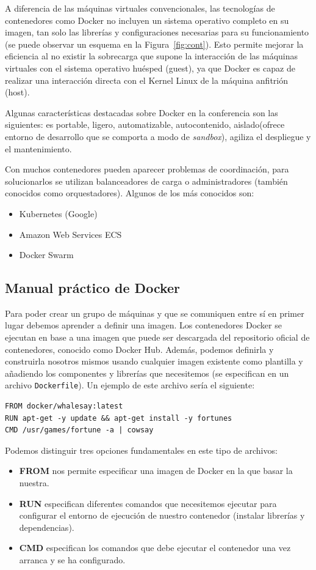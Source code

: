 A diferencia de las máquinas virtuales convencionales, las tecnologías de contenedores como Docker no incluyen un sistema operativo completo en su imagen, tan solo las librerías y configuraciones necesarias para su funcionamiento (se puede observar un esquema en la Figura~\ref{fig:cont}). Esto permite mejorar la eficiencia al no existir la sobrecarga que supone la interacción de las máquinas virtuales con el sistema operativo huésped (guest), ya que Docker es capaz de realizar una interacción directa con el Kernel Linux de la máquina anfitrión (host).

Algunas características destacadas sobre Docker en la conferencia son las siguientes: es portable, ligero, automatizable, autocontenido, aislado(ofrece entorno de desarrollo que se comporta a modo de \textit{sandbox}), agiliza el despliegue y el mantenimiento.

Con muchos contenedores pueden aparecer problemas de coordinación, para solucionarlos se utilizan balanceadores de carga o administradores (también conocidos como orquestadores). Algunos de los más conocidos son:
\begin{itemize}
\item Kubernetes (Google)
\item Amazon Web Services ECS
\item Docker Swarm
\end{itemize}

\subsection{Manual práctico de Docker}
Para poder crear un grupo de máquinas y que se comuniquen entre sí en primer lugar debemos aprender a definir una imagen. Los contenedores Docker se ejecutan en base a una imagen que puede ser descargada del repositorio oficial de contenedores, conocido como Docker Hub. Además, podemos definirla y construirla nosotros mismos usando cualquier imagen existente como plantilla y añadiendo los componentes y librerías que necesitemos (se especifican en un archivo \texttt{Dockerfile}). Un ejemplo de este archivo sería el siguiente:

\begin{lstlisting}
FROM docker/whalesay:latest
RUN apt-get -y update && apt-get install -y fortunes
CMD /usr/games/fortune -a | cowsay
\end{lstlisting}

Podemos distinguir tres opciones fundamentales en este tipo de archivos:
\begin{itemize}
\item \textbf{FROM} nos permite especificar una imagen de Docker en la que basar la nuestra.
\item \textbf{RUN} especifican diferentes comandos que necesitemos ejecutar para configurar el entorno de ejecución de nuestro contenedor (instalar librerías y dependencias). 
\item \textbf{CMD} especifican los comandos que debe ejecutar el contenedor una vez arranca y se ha configurado. 
\end{itemize}

